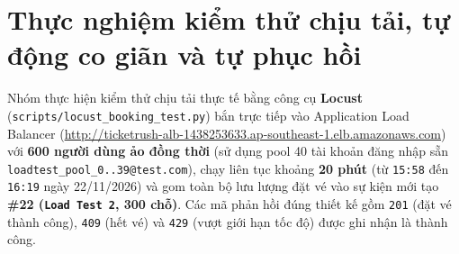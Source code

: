\section{Thực nghiệm kiểm thử chịu tải, tự động co giãn và tự phục hồi}
Nhóm thực hiện kiểm thử chịu tải thực tế bằng công cụ \textbf{Locust} (\texttt{scripts/locust\_booking\_test.py}) bắn trực tiếp vào Application Load Balancer (\url{http://ticketrush-alb-1438253633.ap-southeast-1.elb.amazonaws.com}) với \textbf{600 người dùng ảo đồng thời} (sử dụng pool 40 tài khoản đăng nhập sẵn \texttt{loadtest\_pool\_0..39@test.com}), chạy liên tục khoảng \textbf{20 phút} (từ \texttt{15:58} đến \texttt{16:19} ngày 22/11/2026) và gom toàn bộ lưu lượng đặt vé vào sự kiện mới tạo \textbf{\#22 (\texttt{Load Test 2}, 300 chỗ)}. Các mã phản hồi đúng thiết kế gồm \texttt{201} (đặt vé thành công), \texttt{409} (hết vé) và \texttt{429} (vượt giới hạn tốc độ) được ghi nhận là thành công.

